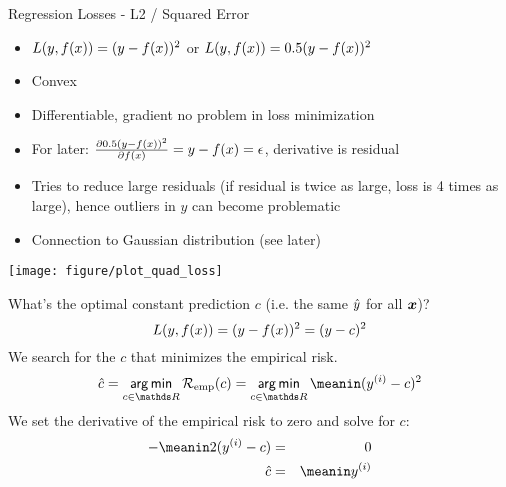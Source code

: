 \begin{vbframe}{Regression Losses - L2 / Squared Error}
\begin{itemize}
\item $L(y, f(x)) = (y-f(x))^2$ or $L(y, f(x)) = 0.5 (y-f(x))^2$
\item Convex
\item Differentiable, gradient no problem in loss minimization
\item For later: $\frac{\partial{0.5 (y-f(x))^2}}{\partial f(x)} = y - f(x) = \epsilon$, derivative is residual
\item Tries to reduce large residuals (if residual is twice as large, loss is 4 times as large), hence
  outliers in $y$ can become problematic
\item Connection to Gaussian distribution (see later)
\end{itemize}

\begin{knitrout}\scriptsize
{}\color{fgcolor}

{\centering \texttt{[image: figure/plot\_quad\_loss]} 
}



\end{knitrout}
\framebreak


What's the optimal constant prediction $c$ (i.e. the same $\hat{y}$ for all $\bm{x}$)?
$$L(y, f(x)) = (y-f(x))^2 = (y - c)^2$$
We search for the $c$ that minimizes the empirical risk.
$$  \hat{c} = \argmin_{c \in \R}\riske(c)  =  \argmin_{c \in \R} \meanin  (\yi-c)^2 $$
We set the derivative of the empirical risk to zero and solve for $c$:
\begin{eqnarray*}
 -\meanin 2(\yi - c) &=& 0 \cr
\hat{c} &=& \meanin \yi
\end{eqnarray*}

%
%
\end{vbframe}

